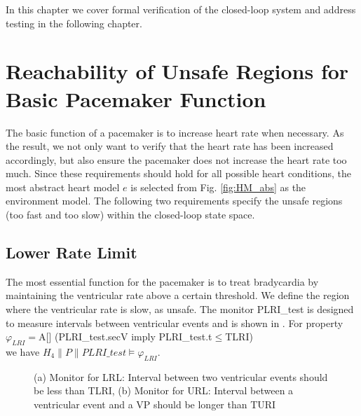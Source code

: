 In this chapter we cover formal verification of the closed-loop system and address testing in the following chapter.

\section{Reachability of Unsafe Regions for Basic Pacemaker Function}
The basic function of a pacemaker is to increase heart rate when necessary. As the result, we not only want to verify that the heart rate has been increased accordingly, but also ensure the pacemaker does not increase the heart rate too much. Since these requirements should hold for all possible heart conditions, the most abstract heart model $e$ is selected from Fig. 	\ref{fig:HM_abs} as the environment model. The following two requirements specify the unsafe regions  (too fast and too slow) within the closed-loop state space.

\subsection{Lower Rate Limit}
\vspace{-10pt}
The most essential function for the pacemaker is to treat bradycardia by maintaining the ventricular rate above a certain threshold. We define the region where the ventricular rate is slow, as \textsf{unsafe}. The monitor \textsf{PLRI\_test} is designed to measure intervals between ventricular events and is shown in . For property \\
\textsf{$\varphi_{LRI}=$A[] (PLRI\_test.secV imply PLRI\_test.t$\leq$TLRI)}\\ we have $H_4\| P\| PLRI\_test\models\varphi_{LRI}$.

\begin{figure}[t]
\centering
	\caption{(a) Monitor for LRL: Interval between two ventricular events should be less than TLRI, (b) Monitor for URL: Interval between a ventricular event and a VP should be longer than TURI}
\vspace{-10pt}
\end{figure} 

